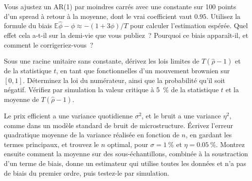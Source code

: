\begin{question}\label{iq:iv1:time-series:18}
Vous ajustez un AR(1) par moindres carrés avec une constante sur 100 points d'un spread à retour à la moyenne, dont le vrai coefficient vaut $0.95$. Utilisez la formule du biais $\mathbb{E}\hat{\phi} - \phi \approx -(1 + 3\phi)/T$ pour calculer l'estimation espérée. Quel effet cela a-t-il sur la demi-vie que vous publiez~? Pourquoi ce biais apparaît-il, et comment le corrigeriez-vous~?
\end{question}

\begin{question}\label{iq:iv1:time-series:19}
Sous une racine unitaire sans constante, dérivez les lois limites de $T(\hat{\rho} - 1)$ et de la statistique $t$, en tant que fonctionnelles d'un mouvement brownien sur $[0, 1]$. Déterminez la loi du numérateur, ainsi que la probabilité qu'il soit négatif. Vérifiez par simulation la valeur critique à 5~\% de la statistique $t$ et la moyenne de $T(\hat{\rho} - 1)$.
\end{question}

\begin{question}\label{iq:iv1:time-series:20}
Le prix efficient a une variance quotidienne $\sigma^2$, et le bruit a une variance $\eta^2$, comme dans un modèle standard de bruit de microstructure. Écrivez l'erreur quadratique moyenne de la variance réalisée en fonction de $n$, en gardant les termes principaux, et trouvez le $n$ optimal, pour $\sigma = 1~\%$ et $\eta = 0.05~\%$. Montrez ensuite comment la moyenne sur des sous-échantillons, combinée à la soustraction d'un terme de biais, donne un estimateur qui utilise toutes les données et n'a pas de biais du premier ordre, puis testez-le par simulation.
\end{question}
